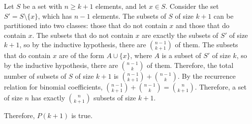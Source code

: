 \begin{enumerate}
\begin{subprove}
    Let \(S\) be a set with \(n \geq k+1\) elements, and let \(x \in S\).
    Consider the set \(S' = S \setminus \{x\}\), which has \(n-1\) elements.
    The subsets of \(S\) of size \(k+1\) can be partitioned into two classes: those that do not contain \(x\) and those that do contain \(x\).
    The subsets that do not contain \(x\) are exactly the subsets of \(S'\) of size \(k+1\), so by the inductive hypothesis, there are \(\binom{n-1}{k+1}\) of them.
    The subsets that do contain \(x\) are of the form \(A \cup \{x\}\), where \(A\) is a subset of \(S'\) of size \(k\), so by the inductive hypothesis, there are \(\binom{n-1}{k}\) of them.
    Therefore, the total number of subsets of \(S\) of size \(k+1\) is \(\binom{n-1}{k+1} + \binom{n-1}{k}\).
    By the recurrence relation for binomial coefficients, \(\binom{n-1}{k+1} + \binom{n-1}{k} = \binom{n}{k+1}\).
    Therefore, a set of size \(n\) has exactly \(\binom{n}{k+1}\) subsets of size \(k+1\).
    
    Therefore, \(P(k+1)\) is true.
    

\end{subprove}
\end{enumerate}
